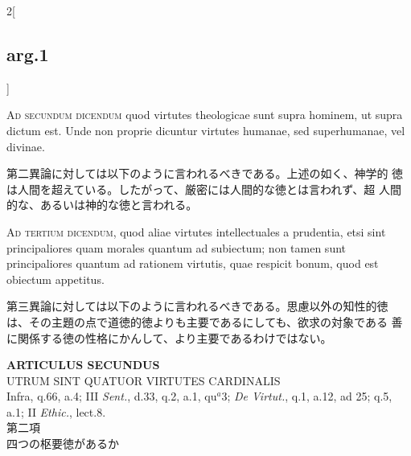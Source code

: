 \documentclass[paper=a4paper,fontsize=10pt,jafontsize=9pt,titlepage]{jlreq}
\begin{document}
\begin{paracol}{2}[\subsection{arg.1}]
\switchcolumn*[\subsection{ad.2}]

{\scshape Ad secundum dicendum} quod virtutes theologicae sunt supra
hominem, ut supra dictum est. Unde non proprie dicuntur virtutes
humanae, sed superhumanae, vel divinae.

\switchcolumn

第二異論に対しては以下のように言われるべきである。上述の如く、神学的
 徳は人間を超えている。したがって、厳密には人間的な徳とは言われず、超
 人間的な、あるいは神的な徳と言われる。

\switchcolumn*[\subsection{ad.3}]

{\scshape Ad tertium dicendum}, quod aliae virtutes intellectuales a
prudentia, etsi sint principaliores quam morales quantum ad subiectum;
non tamen sunt principaliores quantum ad rationem virtutis, quae
respicit bonum, quod est obiectum appetitus.

\switchcolumn

第三異論に対しては以下のように言われるべきである。思慮以外の知性的徳
 は、その主題の点で道徳的徳よりも主要であるにしても、欲求の対象である
 善に関係する徳の性格にかんして、より主要であるわけではない。

\end{paracol}
\newpage
{}
{}
\setcounter{section}{2}
\setcounter{subsection}{0}


\begin{center}
{\Large {\bfseries ARTICULUS SECUNDUS}}\\
{\large UTRUM SINT QUATUOR VIRTUTES CARDINALIS}\\
{\footnotesize Infra, q.66, a.4; III {\itshape Sent.}, d.33, q.2, a.1, qu$^{a}$3; {\itshape De Virtut.}, q.1, a.12, ad 25; q.5, a.1; II {\itshape Ethic.}, lect.8.}\\
{\Large 第二項\\四つの枢要徳があるか}
\end{center}
\end{document}

